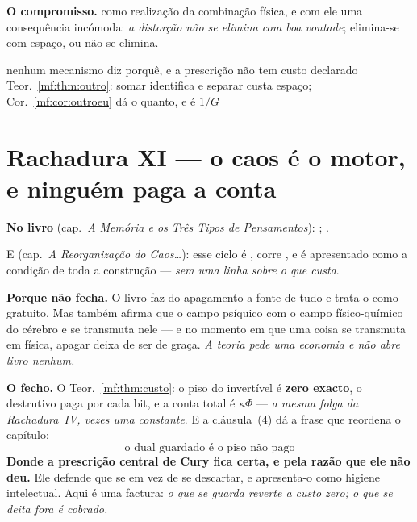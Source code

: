 \documentclass[../livro.tex]{subfiles}
\begin{document}
\medskip\noindent\textbf{O compromisso.}  como realização da combinação
física, e com ele uma consequência
incómoda: \emph{a distorção não se elimina com boa vontade}; elimina-se com
espaço, ou não se elimina.

      {nenhum mecanismo diz porquê, e a prescrição não tem custo declarado}
      {Teor.~\ref{mf:thm:outro}: somar identifica e separar custa espaço;
       Cor.~\ref{mf:cor:outroeu} dá o quanto, e é $1/G$}

\section{Rachadura XI --- o caos é o motor, e ninguém paga a conta}\label{mf:r11}

\noindent\textbf{No livro} (cap.~\emph{A Memória e os Três Tipos de
Pensamentos}): ; .

\noindent E (cap.~\emph{A Reorganização do Caos\dots}): esse ciclo é
, corre , e é
apresentado como a condição de toda a construção --- \emph{sem uma linha sobre o
que custa}.

\medskip\noindent\textbf{Porque não fecha.} O livro faz do apagamento a fonte de
tudo e trata-o como gratuito. Mas também afirma que o campo psíquico
 com o campo físico-químico do cérebro e se transmuta nele ---
e no momento em que uma coisa se transmuta em física, apagar deixa de ser de
graça. \emph{A teoria pede uma economia e não abre livro nenhum.}

\medskip\noindent\textbf{O fecho.} O Teor.~\ref{mf:thm:custo}: o piso do
invertível é \textbf{zero exacto}, o destrutivo paga por cada bit, e a conta
total é $\kappa\Phi$ --- \emph{a mesma folga da Rachadura~IV, vezes uma
constante}. E a cláusula~(4) dá a frase que reordena o capítulo:
\[
\boxed{\;\text{o dual guardado é o piso não pago}\;}
\]
\textbf{Donde a prescrição central de Cury fica certa, e pela razão que ele não
deu.} Ele defende que se  em vez de se
descartar, e apresenta-o como higiene intelectual. Aqui é uma factura: \emph{o
que se guarda reverte a custo zero; o que se deita fora é cobrado.}
\end{document}
